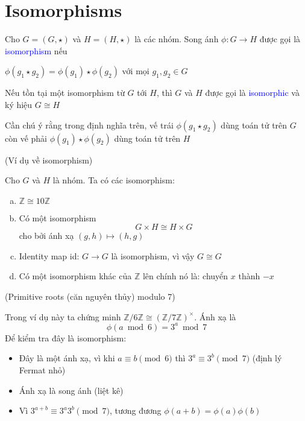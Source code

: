 \section{Isomorphisms}

\begin{definition}
	Cho $G=(G,\star)$ và $H=(H, \star)$ là các nhóm. Song ánh $\phi: G \rightarrow H$ được gọi là \textcolor{blue}{isomorphism} nếu
	
	\begin{center}
	 $\phi(g_1 \star g_2) = \phi (g_1) \star \phi (g_2)$ với mọi $g_1, g_2 \in G$
	 \end{center}
 
 Nếu tồn tại một isomorphism từ $G$ tới $H$, thì $G$ và $H$ được gọi là \textcolor{blue}{isomorphic} và ký hiệu $G \cong H$
 
 Cần chú ý rằng trong định nghĩa trên, vế trái $\phi(g_1 \star g_2)$ dùng toán tử trên $G$ còn vế phải $\phi(g_1) \star \phi(g_2)$ dùng toán tử trên $H$
\end{definition}

\begin{example} (Ví dụ về isomorphism)
	
	Cho $G$ và $H$ là nhóm. Ta có các isomorphism:
	\begin{enumerate}[(a)]
		\item $\mathbb{Z} \cong 10 \mathbb{Z}$
		\item Có một isomorphism
		\begin{equation*} 
			G \times H \cong H \times G 
		\end{equation*} cho bởi ánh xạ $(g, h) \mapsto (h, g)$
	\item Identity map id: $G \rightarrow G$ là isomorphism, vì vậy $G \cong G$
	\item Có một isomorphism khác của $\mathbb{Z}$ lên chính nó là: chuyển $x$ thành $-x$
	\end{enumerate}
\end{example}

\begin{example} (Primitive roots (căn nguyên thủy) modulo 7)
	
	Trong ví dụ này ta chứng minh $\mathbb{Z}/6 \mathbb{Z} \cong (\mathbb{Z}/7 \mathbb{Z})^{\times}$. Ánh xạ là \begin{equation*} \phi(a \bmod 6) = 3^a \bmod 7 \end{equation*} 
	Để kiểm tra đây là isomorphism:
	\begin{itemize}
		\item Đây là một ánh xạ, vì khi $a \equiv b \pmod 6$ thì $3^a \equiv 3^b \pmod 7$ (định lý Fermat nhỏ)
		\item Ánh xạ là song ánh (liệt kê)
		\item Vì $3^{a+b} \equiv 3^a 3^b \pmod 7$, tương đương $\phi(a+b) = \phi(a) \phi(b)$	
	\end{itemize}
	
\end{example}